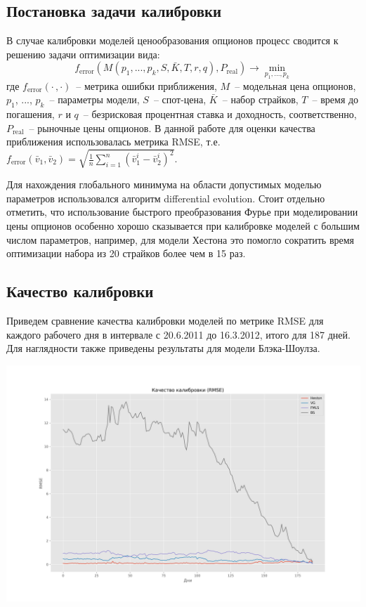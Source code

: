 \documentclass[oneside, final, 12pt, a4paper]{article}
\begin{document}
\subsection{Постановка задачи калибровки}
В случае калибровки моделей ценообразования опционов процесс сводится к решению задачи оптимизации вида:
\[
f_\text{error}(M(p_1, ..., p_k, S, \bar K, T, r, q), P_\text{real}) \rightarrow \underset{p_1, ..., p_k}{\min}
\]
где $f_\text{error}(\cdot \, , \cdot)$~-- метрика ошибки приближения, $M$~-- модельная цена опционов,\\ $p_1$, ..., $p_k$~-- параметры модели, $S$~-- спот-цена, $\bar K$~-- набор страйков, $T$~-- время до погашения, $r$ и $q$~-- безрисковая процентная ставка и доходность, соответственно, $P_\text{real}$~-- рыночные цены опционов. В данной работе для оценки качества приближения использовалась метрика RMSE, т.е. \( f_\text{error}(\bar v_1, \bar v_2) = \sqrt{ \frac{1}{n} \sum\limits_{i = 1}^n{(\bar v_1^i - \bar v_2^i)^2} } \). 
\par
Для нахождения глобального минимума на области допустимых моделью параметров использовался алгоритм differential evolution\cite{DE:paper1}\cite{DE:paper2}. Стоит отдельно отметить, что использование быстрого преобразования Фурье\cite{FFT:paper} при моделировании цены опционов особенно хорошо сказывается при калибровке моделей с большим числом параметров, например, для модели Хестона это помогло сократить время оптимизации набора из 20 страйков более чем в 15 раз.

\newpage
\subsection{Качество калибровки}
\label{quality:label}
Приведем сравнение качества калибровки моделей по метрике RMSE для каждого рабочего дня в интервале с 20.6.2011 до 16.3.2012, итого для 187 дней. Для наглядности также приведены результаты для модели Блэка-Шоулза.

\begin{center}
  \includegraphics[width=1\linewidth]{img/RMSE_quality.png}
\end{center}
\end{document}
